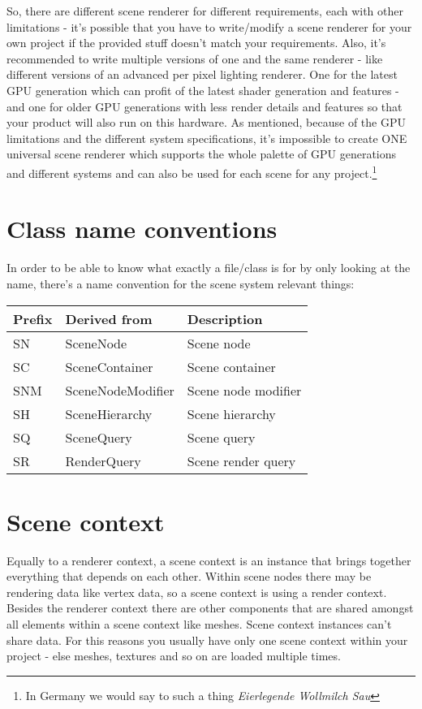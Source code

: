 So, there are different scene renderer for different requirements, each with other limitations - it's possible that you have to write/modify a scene renderer for your own project if the provided stuff doesn't match your requirements. Also, it's recommended to write multiple versions of one and the same renderer - like different versions of an advanced per pixel lighting renderer. One for the latest GPU generation which can profit of the latest shader generation and features - and one for older GPU generations with less render details and features so that your product will also run on this hardware. As mentioned, because of the GPU limitations and the different system specifications, it's impossible to create ONE universal scene renderer which supports the whole palette of GPU generations and different systems and can also be used for each scene for any project.\footnote{In Germany we would say to such a thing \emph{Eierlegende Wollmilch Sau}}




\section{Class name conventions}
In order to be able to know what exactly a file/class is for by only looking at the name, there's a name convention for the scene system relevant things:

\begin{tabular}{|p{2cm}|p{5cm}|p{7cm}|}
\hline
\textbf{Prefix} & \textbf{Derived from} & \textbf{Description}\\
\hline
SN  & SceneNode         & Scene node\\
\hline
SC  & SceneContainer    & Scene container\\
\hline
SNM & SceneNodeModifier & Scene node modifier \\
\hline
SH  & SceneHierarchy    & Scene hierarchy\\
\hline
SQ  & SceneQuery        & Scene query\\
\hline
SR  & RenderQuery       & Scene render query\\
\hline
\end{tabular}




\section{Scene context}
Equally to a renderer context, a scene context is an instance that brings together everything that depends on each other. Within scene nodes there may be rendering data like vertex data, so a scene context is using a render context. Besides the renderer context there are other components that are shared amongst all elements within a scene context like meshes. Scene context instances can't share data. For this reasons you usually have only one scene context within your project - else meshes, textures and so on are loaded multiple times.




